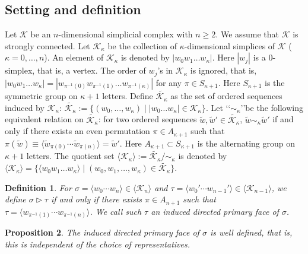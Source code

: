 \documentclass[a4paper,12pt]{article}
\newtheorem{definition}{Definition}[section]
\newtheorem{proposition}[definition]{Proposition}
\numberwithin{equation}{section}
\begin{document}
\subsection{Setting and definition}
\label{section-setting}
Let $\mathcal{K}$ be an $n$-dimensional simplicial complex with $n\geq 2$.
We assume that $\mathcal{K}$ is strongly connected. 
Let $\mathcal{K}_{\kappa}$ be the collection of $\kappa$-dimensional simplices of $\mathcal{K}$ ($\kappa=0,\dots,n$). 
An element of $\mathcal{K}_{\kappa}$ is denoted by $|w_0w_1\dots w_\kappa|$. 
Here $|w_j|$ is a $0$-simplex, that is, a vertex. 
The order of $w_j$'s in $\mathcal{K}_{\kappa}$ is ignored, that is, $|w_0w_1\dots w_\kappa|=|w_{\pi^{-1}(0)}w_{\pi^{-1}(1)}\dots w_{\pi^{-1}(\kappa)}|$ 
for any $\pi\in S_{\kappa+1}$. Here $S_{\kappa+1}$ is the symmetric group on $\kappa+1$ letters. 
%
Define $\tilde {\mathcal{K}_\kappa}$ as the set of ordered sequences induced by $\mathcal{K}_\kappa$: $\tilde {\mathcal{K}_\kappa} := \{ (w_0,\dots,w_\kappa) \;|\; |w_0\dots w_\kappa| \in \mathcal{K}_{\kappa}\}$. 
Let \lq\lq $\sim_\kappa$\rq\rq  be the following equivalent relation on $\tilde {\mathcal{K}_\kappa}$: 
for two ordered sequences $\tilde w, \tilde w'\in \tilde {\mathcal{K}_\kappa}$, $\tilde w\sim_\kappa \tilde w'$ if and only if 
there exists an even permutation $\pi\in A_{\kappa+1}$ such that $\pi(\tilde w)\equiv \langle \tilde w_{\pi(0)} \cdots \tilde w_{\pi(n)}\rangle= \tilde w'$. 
Here $A_{\kappa+1}\subset S_{\kappa+1}$ is the alternating group on $\kappa+1$ letters. 
The quotient set $\langle \mathcal{K}_\kappa \rangle:= \tilde{\mathcal{K}_\kappa}/{\sim_\kappa}$ is denoted by 
$\langle \mathcal{K}_\kappa \rangle=\{\langle w_0w_1\dots w_{\kappa} \rangle \;|\; ( w_0,w_1,\dots, w_{\kappa})\in \tilde{\mathcal{K}_{\kappa}}\}$. 
%
\begin{definition}\rm
For $\sigma=\langle w_0\cdots w_{n} \rangle\in \langle \mathcal{K}_n\rangle$ and 
$\tau=\langle w_0'\cdots w_{n-1}' \rangle\in \langle \mathcal{K}_{n-1}\rangle$, we define 
$\sigma \triangleright \tau$ if and only if there exists $\pi\in A_{n+1}$ such that 
$\tau=\langle w_{\pi^{-1}(1)}\cdots w_{\pi^{-1}(n)}\rangle$. 
We call such $\tau$ an induced directed primary face of $\sigma$. 
\end{definition}
\begin{proposition}
\label{propwelldefine}
The induced directed primary face of $\sigma$ is well defined, 
that is, this is independent of the choice of representatives. 
\end{proposition}
%
\end{document}
